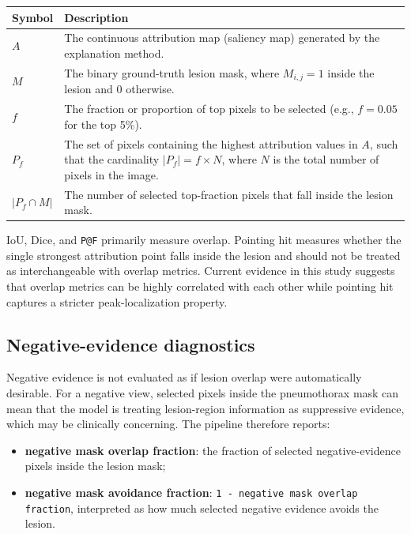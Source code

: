 \begin{itemize}
\begin{equation}
		\label{eq:3-4}
	\end{equation}
	\begin{center}
		\small
		\begin{tabular}{lp{9cm}}
			\toprule
			\textbf{Symbol} & \textbf{Description} \\
			\midrule
			$A$ & The continuous attribution map (saliency map) generated by the explanation method. \\
			$M$ & The binary ground-truth lesion mask, where $M_{i,j} = 1$ inside the lesion and $0$ otherwise. \\
			$f$ & The fraction or proportion of top pixels to be selected (e.g., $f = 0.05$ for the top 5\%). \\
			$P_f$ & The set of pixels containing the highest attribution values in $A$, such that the cardinality $|P_f| = f \times N$, where $N$ is the total number of pixels in the image. \\
			$|P_f \cap M|$ & The number of selected top-fraction pixels that fall inside the lesion mask. \\
			\bottomrule
		\end{tabular}
	\end{center}
\end{itemize}

IoU, Dice, and \texttt{P@F} primarily measure overlap. Pointing
hit measures whether the single strongest attribution point falls inside
the lesion and should not be treated as interchangeable with overlap
metrics. Current evidence in this study suggests that overlap metrics can be
highly correlated with each other while pointing hit captures a stricter
peak-localization property.

\hypertarget{negative-evidence-diagnostics}{%
	\subsection{Negative-evidence
		diagnostics}\label{negative-evidence-diagnostics}}

Negative evidence is not evaluated as if lesion overlap were
automatically desirable. For a negative view, selected pixels inside the
pneumothorax mask can mean that the model is treating lesion-region
information as suppressive evidence, which may be clinically concerning.
The pipeline therefore reports:

\begin{itemize}
	\tightlist
	\item
	\textbf{negative mask overlap fraction}: the fraction of selected
	negative-evidence pixels inside the lesion mask;
	\item
	\textbf{negative mask avoidance fraction}:
	\texttt{1\ -\allowbreak \ negative \allowbreak mask \allowbreak overlap \allowbreak fraction}, interpreted as how
	much selected negative evidence avoids the lesion.
\end{itemize}

